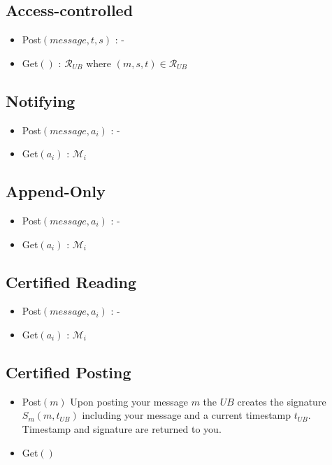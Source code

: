 \documentclass[bibtotoc,halfparskip,oneside]{scrreprt}
\newcommand{\UB}{\ensuremath{\mathit{UB}}\xspace}
\begin{document}
\subsection{Access-controlled}

\begin{itemize}
	\item Post$(message,t,s)$ : -
	\item Get$()$ : $\mathcal{R}_\UB$ where $(m,s,t) \in \mathcal{R}_\UB$
\end{itemize}

\subsection{Notifying}

\begin{itemize}
	\item Post$(message,a_i)$ : -
	\item Get$(a_i)$ : $\mathcal{M}_i$
\end{itemize}

\subsection{Append-Only}

\begin{itemize}
	\item Post$(message,a_i)$ : -
	\item Get$(a_i)$ : $\mathcal{M}_i$
\end{itemize}

\subsection{Certified Reading}

\begin{itemize}
	\item Post$(message,a_i)$ : -
	\item Get$(a_i)$ : $\mathcal{M}_i$
\end{itemize}

\subsection{Certified Posting}

\begin{itemize}
	\item Post$(m)$ Upon posting your message $m$ the \UB creates the signature $S_m(m,t_\UB)$ including your message
	and a current timestamp $t_\UB$. Timestamp and signature are returned to you.
	\item Get$()$ 
\end{itemize}
\end{document}
